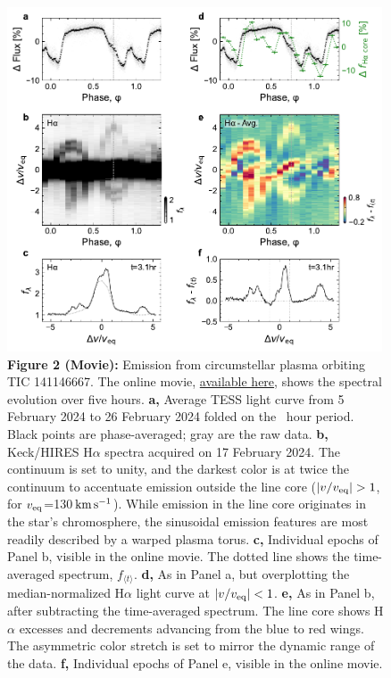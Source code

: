 \documentclass{nature3}
\newcommand{\kms}{\ensuremath{\rm km\,s^{-1}}}
\begin{document}
\begin{figure}[!tp]
  \centering
  \includegraphics[width=0.99\textwidth]{figures/f2.pdf}
  \captionsetup{labelformat=empty}
  \caption{{\bf Figure 2 (Movie):}  
  Emission from circumstellar plasma orbiting TIC 141146667.
  The online movie,
  \href{https://lgbouma.com/movies/TIC141146667_sixpanel.mp4}{available here},
  shows the spectral evolution over five hours.
  {\bf a,} Average TESS light curve from 5 February 2024 to 26
  February 2024 folded on the \periodhr\ hour period.  Black
  points are phase-averaged; gray are the raw data.
  {\bf b,} Keck/HIRES H$\alpha$ spectra acquired on 17
  February 2024.  The continuum is set to unity, and the darkest color
  is at twice the continuum to accentuate emission outside the line
  core ($|v/v_{\rm eq}|>1$, for $v_{\rm eq}$=130\,\kms).  While
  emission in the line core originates in the star's chromosphere,
  the sinusoidal emission features are most readily described by a
  warped plasma torus.
  {\bf c,} Individual epochs of Panel b, visible in the
  online movie.  The dotted line shows the time-averaged spectrum,
  $f_{\langle t \rangle}$.
  {\bf d,} As in Panel a, but overplotting the
  median-normalized H$\alpha$ light curve at $|v/v_{\rm eq}|<1$.
  {\bf e,} As in Panel b, after subtracting the time-averaged
  spectrum.  The line core shows H$\alpha$ excesses and decrements
  advancing from the blue to red wings.
  The asymmetric color stretch
  is set to mirror the dynamic range of the data.
  {\bf f,} Individual epochs of Panel e, visible in the online
  movie.}
  \label{fig:spec}
\end{figure}
\end{document}
